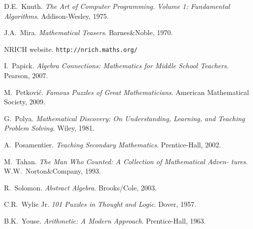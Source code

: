 \begin{thebibliography}{99}
 D.E.\ Knuth. \emph{The Art of Computer Programming. Volume 1: Fundamental Algorithms}. Addison-Wesley, 1975.

 J.A.\ Mira. \emph{Mathematical Teasers}. Barnes\&Noble, 1970.

 NRICH website.  
\texttt{http://nrich.maths.org/}

 I.\ Papick. \emph{Algebra Connections: Mathematics
  for Middle School Teachers.} Pearson, 2007.

 M.\ Petkovi\'{c}. \emph{Famous Puzzles of Great Mathematicians}. American Mathematical Society, 2009.

 G.\ Polya. \emph{Mathematical Discovery: On
  Understanding, Learning, and Teaching Problem Solving.} Wiley, 1981.

 A.\ Posamentier. \emph{Teaching Secondary Mathematics}. Prentice-Hall, 2002.

 M.\ Tahan. \emph{The Man Who Counted: A Collection of Mathematical Adven-
tures}. W.W.\ Norton\&Company, 1993.

 R.\ Solomon. \emph{Abstract Algebra}. Brooks/Cole, 2003.

 C.R.\ Wylie Jr. \emph{101 Puzzles in Thought and
  Logic}. Dover, 1957.

 B.K.\ Youse. \emph{Arithmetic: A Modern Approach}. Prentice-Hall, 1963.

\end{thebibliography}



\printindex
